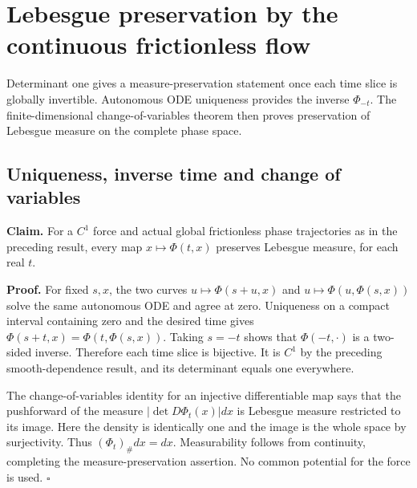 \documentclass[11pt,a4paper]{report}
\begin{document}
\section{\texorpdfstring{Lebesgue preservation by the continuous frictionless flow}{Lebesgue preservation by the continuous frictionless flow}}


Determinant one gives a measure-preservation statement once each time slice is globally invertible. Autonomous ODE uniqueness provides the inverse \(\Phi_{-t}\). The finite-dimensional change-of-variables theorem then proves preservation of Lebesgue measure on the complete phase space.

\subsection{\texorpdfstring{Uniqueness, inverse time and change of variables}{Uniqueness, inverse time and change of variables}}


\textbf{Claim.} For a \(C^1\) force and actual global frictionless phase trajectories as in the preceding result, every map \(x\mapsto\Phi(t,x)\) preserves Lebesgue measure, for each real \(t\).



\textbf{Proof.} For fixed \(s,x\), the two curves \(u\mapsto\Phi(s+u,x)\) and \(u\mapsto\Phi(u,\Phi(s,x))\) solve the same autonomous ODE and agree at zero. Uniqueness on a compact interval containing zero and the desired time gives \(\Phi(s+t,x)=\Phi(t,\Phi(s,x))\). Taking \(s=-t\) shows that \(\Phi(-t,\cdot)\) is a two-sided inverse. Therefore each time slice is bijective. It is \(C^1\) by the preceding smooth-dependence result, and its determinant equals one everywhere.



The change-of-variables identity for an injective differentiable map says that the pushforward of the measure \(|\det D\Phi_t(x)|dx\) is Lebesgue measure restricted to its image. Here the density is identically one and the image is the whole space by surjectivity. Thus \((\Phi_t)_\#dx=dx\). Measurability follows from continuity, completing the measure-preservation assertion. No common potential for the force is used. \(\square\)
\end{document}
